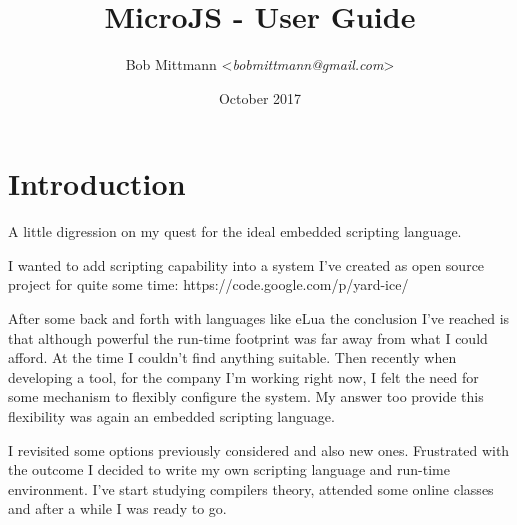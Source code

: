 \documentclass[11pt]{article} %
\title{MicroJS - User Guide}
\author{Bob Mittmann <\textit{bobmittmann@gmail.com}>}
\date{October 2017}
\begin{document}
\maketitle
\thispagestyle{empty}
\newpage
{}
\tableofcontents
\newpage
\listoffigures
\newpage
\listoftables
\newpage
{}

\section{Introduction}

A little digression on my quest for the ideal embedded scripting language.

I wanted to add scripting capability into a system I've created as open source project for quite some time: https://code.google.com/p/yard-ice/

After some back and forth with languages like eLua the conclusion I've reached is that although powerful the run-time footprint was far away from what I could afford. At the time I couldn't find anything suitable.
Then recently when developing a tool, for the company I'm working right now, I felt the need for some mechanism to flexibly configure the system. My answer too provide this flexibility was again an embedded scripting language. 

I revisited some  options previously considered and also new ones. Frustrated with the outcome I decided to write my own scripting language and run-time environment. I've start studying compilers theory, attended some online classes and after a while I was ready to go.
\end{document}
